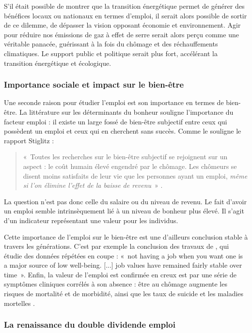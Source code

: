 S’il était possible de montrer que la transition énergétique permet de générer des bénéfices locaux ou nationaux en termes d'emploi, il serait alors possible de sortir de ce dilemme, de dépasser la vision opposant économie et environnement. Agir pour réduire nos émissions de gaz à effet de serre serait alors perçu comme une véritable panacée, guérissant à la fois du chômage et des réchauffements climatiques. Le support public et politique serait plus fort, accélérant la transition énergétique et écologique.

\subsubsection{Importance sociale et impact sur le bien-être}

Une seconde raison pour étudier l'emploi est son importance en termes de bien-être.
La littérature sur les déterminants du bonheur souligne l’importance du facteur emploi : il existe un large fossé de bien-être subjectif entre ceux qui possèdent un emploi et ceux qui en cherchent sans succès. Comme le souligne le rapport Stiglitz : 
\begin{quote}
	«~Toutes les recherches sur le bien-être subjectif se rejoignent sur un aspect : le coût humain élevé engendré par le chômage. Les chômeurs se disent moins satisfaits de leur vie que les personnes ayant un emploi, \textit{même si l'on élimine l'effet de la baisse de revenu}~» \citep[p. 166, l'emphase est de mon fait]{Stiglitz2009}.
\end{quote}			
La question n'est pas donc celle du salaire ou du niveau de revenu. Le fait d'avoir un emploi semble intrinsèquement lié à un niveau de bonheur plus élevé. Il s'agit d'un indicateur représentant une valeur pour les individus.

Cette importance de l’emploi sur le bien-être est une d'ailleurs conclusion stable à travers les générations. C'est par exemple la conclusion des travaux de \citet{Clark2009}, qui étudie des données répétées en coupe :
«~not having a job when you want one is a major source of low well-being. [...] job values have remained fairly stable over time~». Enfin, la valeur de l'emploi est confirmée en creux est par une série de symptômes cliniques corrélés à son absence : être au chômage augmente les risques de mortalité et de morbidité, ainsi que les taux de suicide et les maladies mortelles \citep{Gerdtham2003}.


\subsubsection{La renaissance du double dividende emploi}


